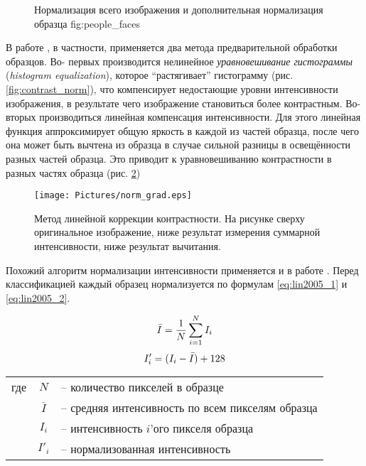 \documentclass[12pt]{report}
\begin{document}
\begin{figure}[h]
	\centering
	\caption{Нормализация всего изображения  и дополнительная нормализация образца \subref
{fig:people_faces}}
	\label{fig:normalize_example}
\end{figure}

В работе \citep{rowley1998neural}, в частности, применяется два метода предварительной обработки образцов. Во-
первых 
производится нелинейное \emph{уравновешивание гистограммы} (\textit{histogram equalization}), которое 
``растягивает'' 
гистограмму (рис. \ref{fig:contrast_norm}), что компенсирует недостающие уровни интенсивности изображения, в 
результате чего изображение становиться 
более контрастным. Во-вторых производиться линейная компенсация интенсивности. Для этого линейная функция 
аппроксимирует общую яркость в каждой из частей образца, после чего она может быть вычтена из образца в случае 
сильной разницы в освещённости разных частей образца. Это приводит к уравновешиванию контрастности в разных частях 
образца (рис. \ref{fig:norm_grad}) 

\begin{figure}[h]
	\centering
	\texttt{[image: Pictures/norm\_grad.eps]}
	\caption{Метод линейной коррекции контрастности. На рисунке сверху оригинальное изображение, ниже результат 
измерения суммарной интенсивности, ниже результат вычитания. \citep{rowley1998neural}}
	\label{fig:norm_grad}
\end{figure}

Похожий алгоритм нормализации интенсивности применяется и в работе \citep{lin2005face}. Перед классификацией каждый 
образец нормализуется по формулам \ref{eq:lin2005_1} и \ref{eq:lin2005_2}.

\begin{equation}
\label{eq:lin2005_1}
\centering
\bar{I}=\frac{1}{N}\sum_{i=1}^{N}I_{i}
\end{equation}
\begin{equation}
\label{eq:lin2005_2}
\centering
{I}'_i=(I_i-\bar{I})+128
\end{equation}

\begin{tabular}{p{3cm} c l}
где & $N$ & -- количество пикселей в образце\\
	& $\bar{I}$ & -- средняя интенсивность по всем пикселям образца\\
	& $I_i$ & -- интенсивность $i$'ого пикселя образца\\
	& ${I}'_i$ & -- нормализованная интенсивность\\
\end{tabular}
\end{document}

